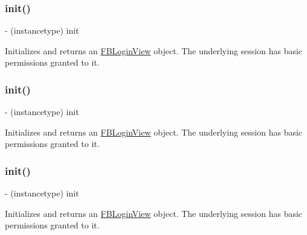 \subsubsection{\texorpdfstring{init()}{init()}\hspace{0.1cm}{\footnotesize\ttfamily [2/5]}}
{\footnotesize\ttfamily -\/ (instancetype) init \begin{DoxyParamCaption}{ }\end{DoxyParamCaption}}

Initializes and returns an {\ttfamily \hyperlink{interfaceFBLoginView}{F\+B\+Login\+View}} object. The underlying session has basic permissions granted to it. \mbox{\label{interfaceFBLoginView_ae0dfdb97b6ddecbd42bb778b02d3f890}} 
\subsubsection{\texorpdfstring{init()}{init()}\hspace{0.1cm}{\footnotesize\ttfamily [3/5]}}
{\footnotesize\ttfamily -\/ (instancetype) init \begin{DoxyParamCaption}{ }\end{DoxyParamCaption}}

Initializes and returns an {\ttfamily \hyperlink{interfaceFBLoginView}{F\+B\+Login\+View}} object. The underlying session has basic permissions granted to it. \mbox{\label{interfaceFBLoginView_ae0dfdb97b6ddecbd42bb778b02d3f890}} 
\subsubsection{\texorpdfstring{init()}{init()}\hspace{0.1cm}{\footnotesize\ttfamily [4/5]}}
{\footnotesize\ttfamily -\/ (instancetype) init \begin{DoxyParamCaption}{ }\end{DoxyParamCaption}}

Initializes and returns an {\ttfamily \hyperlink{interfaceFBLoginView}{F\+B\+Login\+View}} object. The underlying session has basic permissions granted to it. \mbox{\label{interfaceFBLoginView_ae0dfdb97b6ddecbd42bb778b02d3f890}} 
